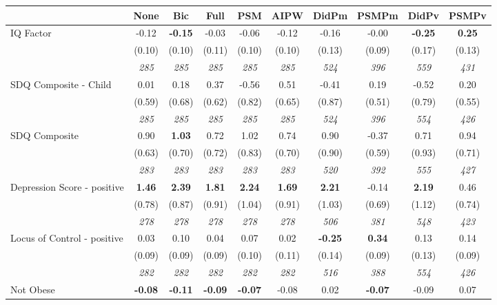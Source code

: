 \begin{tabular}{l c c c c c c c c c}
\toprule
 & None & Bic & Full & PSM & AIPW & DidPm & PSMPm & DidPv & PSMPv \\
\midrule
IQ Factor & -0.12 & \textbf{ -0.15 } & -0.03 & -0.06 & -0.12 & -0.16 & -0.00 & \textbf{ -0.25 } & \textbf{0.25} \\
& (0.10) & (0.10) & (0.11) & (0.10) & (0.10) & (0.13) & (0.09) & (0.17) & (0.13) \\
& \textit{ 285 } & \textit{ 285 } & \textit{ 285 } & \textit{ 285 } & \textit{ 285 } & \textit{ 524 } & \textit{ 396 } & \textit{ 559 } & \textit{ 431 } \\
SDQ Composite - Child & 0.01 & 0.18 & 0.37 & -0.56 & 0.51 & -0.41 & 0.19 & -0.52 & 0.20 \\
& (0.59) & (0.68) & (0.62) & (0.82) & (0.65) & (0.87) & (0.51) & (0.79) & (0.55) \\
& \textit{ 285 } & \textit{ 285 } & \textit{ 285 } & \textit{ 285 } & \textit{ 285 } & \textit{ 524 } & \textit{ 396 } & \textit{ 554 } & \textit{ 426 } \\
SDQ Composite & 0.90 & \textbf{ 1.03 } & 0.72 & 1.02 & 0.74 & 0.90 & -0.37 & 0.71 & 0.94 \\
& (0.63) & (0.70) & (0.72) & (0.83) & (0.70) & (0.90) & (0.59) & (0.93) & (0.71) \\
& \textit{ 283 } & \textit{ 283 } & \textit{ 283 } & \textit{ 283 } & \textit{ 283 } & \textit{ 520 } & \textit{ 392 } & \textit{ 555 } & \textit{ 427 } \\
Depression Score - positive & \textbf{ 1.46 } & \textbf{ 2.39 } & \textbf{ 1.81 } & \textbf{2.24} & \textbf{1.69} & \textbf{ 2.21 } & -0.14 & \textbf{ 2.19 } & 0.46 \\
& (0.78) & (0.87) & (0.91) & (1.04) & (0.91) & (1.03) & (0.69) & (1.12) & (0.74) \\
& \textit{ 278 } & \textit{ 278 } & \textit{ 278 } & \textit{ 278 } & \textit{ 278 } & \textit{ 506 } & \textit{ 381 } & \textit{ 548 } & \textit{ 423 } \\
Locus of Control - positive & 0.03 & 0.10 & 0.04 & 0.07 & 0.02 & \textbf{ -0.25 } & \textbf{0.34} & 0.13 & 0.14 \\
& (0.09) & (0.09) & (0.09) & (0.10) & (0.11) & (0.14) & (0.09) & (0.13) & (0.09) \\
& \textit{ 282 } & \textit{ 282 } & \textit{ 282 } & \textit{ 282 } & \textit{ 282 } & \textit{ 516 } & \textit{ 388 } & \textit{ 554 } & \textit{ 426 } \\
Not Obese & \textbf{ -0.08 } & \textbf{ -0.11 } & \textbf{ -0.09 } & \textbf{-0.07} & -0.08 & 0.02 & \textbf{-0.07} & -0.09 & 0.07 \\

\end{tabular}
